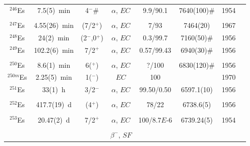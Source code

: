 \begin{center}
\begin{longtable}{c|ccccccl}
$^{246}$Es	& 7.5(5)~min	&4$^-\#$	&$\alpha$, $EC$		&9.9/90.1		& 7640(100)$\#$	&1954	&{\tiny\cite{Ghiorso1954,Mikheev1967,Gangrsky1980,Hatsukawa1989,Shaughnessy2001,Hessberger2005}}\\
			& 				&  			&					&			    & 				&		&{\tiny\cite{Gates2008,Ito2018,Vostinar2019}}\\
$^{247}$Es	& 4.55(26)~min	&  (7/2$^+$)	&$\alpha$, $EC$	&7/93    		& 7464(20)		&1967	&{\tiny\cite{Mikheev1967,Hatsukawa1989,Hessberger2005,Chatillon2006}}\\
$^{248}$Es	& 24(2)~min		&  (2$^-$,0$^+$)&$\alpha$, $EC$	&0.3/99.7		& 7160(50)$\#$	&1956	&{\tiny\cite{Chetham1956,Ahmad1970,Gangrsky1980,Chasteler1987,Hatsukawa1989,Shaughnessy2001}}\\
$^{249}$Es	&102.2(6)~min	&  7/2$^+$	&$\alpha$, $EC$		&0.57/99.43	& 6940(30)$\#$		&1956	&{\tiny\cite{Harvey1956,Ahmad1970,Ahmad1976a,Gavron1977,Chasteler1987,Gregorich1987a}}\\
			& 				&  			&					&			    & 				&		&{\tiny\cite{Hatsukawa1989,Hessberger2005,Hessberger2012}}\\
$^{250}$Es	&8.6(1)~min		&  6($^+$)	&$\alpha$, $EC$		&?/100	        & 6830(120)$\#$	&1956	&{\tiny\cite{Harvey1956,Ahmad1970,Gavron1977,Chasteler1987,Gregorich1987a,Welch1987}}\\
$^{250m}$Es	&2.25(5)~min	&  1($^-$)	&$EC$				&100			& 				&1970	&{\tiny\cite{Ahmad1970,Freedman1977}}\\
$^{251}$Es	&33(1)~h		&  3/2$^-$	&$\alpha$, $EC$		&99.50/0.50	& 6597.1(10)		&1956	&{\tiny\cite{Harvey1956,Ahmad1970,Gavron1977,Ahmad1978,Chasteler1987,Gregorich1987a}}\\
			& 				&  			&					&			    & 				&		&{\tiny\cite{Ahmad2000,Pal2021}}\\
$^{252}$Es	&417.7(19)~d	&  (4$^+$)	&$\alpha$, $EC$		&78/22		    & 6738.6(5)		&1956	&{\tiny\cite{Harvey1956,Fields1973,Ahmad1977a,Gregorich1987a,Moody1993,Ahmad2000}}\\
			& 				&  			&					&			    & 				&		&{\tiny\cite{Hessberger2005,Kratz2013}}\\
$^{253}$Es	&20.47(2)~d		&  7/2$^+$	&$\alpha$, $EC$		&100/8.7$E$-6	& 6739.24(5)	&1954	&{\tiny\cite{Thompson1954,Fields1954,Jones1956,Metta1965,Chasteler1987,Gregorich1987a}}\\
			& 				&  			&					&      			& 				&		&{\tiny\cite{Moody1993,Severijns2005,Ahmad2006,Severijns2007,Severijns2009,Kondev2009}}\\
			&				& 			&$\beta^-$, $SF$	&		       	& 				&		&{\tiny\cite{Kratz2013,Nothelfer2022}}\\

\end{longtable}
\end{center}
